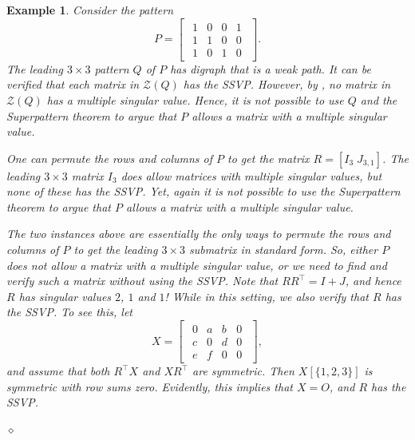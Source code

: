 \documentclass[preprint,12pt]{elsarticle}
\newcommand{\trans  }{^\top}
\newtheorem{Example}[theorem]{Example}
\begin{document}
\begin{Example}
\label{forbiddensun}
\rm
Consider the pattern 
\[
P= \begin{bmatrix}
\begin{array}{cccc}
1 & 0 &0  & 1 \\
1 & 1 & 0 & 0\\
1 & 0 & 1 & 0
\end{array}
\end{bmatrix}.
\]
The leading $3\times 3$ pattern $Q$ of $P$
has digraph that is a weak path. It can be verified that each matrix in $\mathcal{Z}(Q)$ 
has the SSVP. However,  by ,  no matrix in $\mathcal{Z}(Q)$ has a multiple singular value. Hence,
it is not possible to use $Q$ and the Superpattern theorem to argue that $P$ allows a matrix with a multiple singular value. 

One can  permute the rows and columns of $P$ to get the matrix $R=[ I_3 \; J_{3,1} ]$.
The leading $3\times 3$ matrix $I_3$ does allow matrices with multiple singular values, but none of these has the SSVP. 
Yet, again
it is not possible to use the Superpattern  theorem to argue that $P$ allows a matrix with a multiple singular value. 

The two 
instances above are essentially the only ways to permute the rows and columns of $P$ to get the leading $3\times 3$ submatrix in standard form.
So, either $P$ does not allow a matrix with 
a multiple singular value, or we need to 
find and verify such a matrix without using
the SSVP.  
Note that  $RR\trans= I+J$, and hence $R$ has 
singular values $2$, $1$ and $1$! While in this setting, we also verify that $R$ has the SSVP. 
To see this, let 
\[ 
X= \begin{bmatrix}
\begin{array}{cccc}
0 & a & b & 0 \\
c & 0 & d & 0 \\
e& f & 0 & 0 
\end{array} 
\end{bmatrix},
\]
and assume that both $R\trans X$ and $XR\trans$
are symmetric. Then
$X[\{1,2,3\}]$ is symmetric with row sums zero.
Evidently, this implies that $X=O$, and 
$R$ has the SSVP. 

\hfill $\diamond$  \end{Example}
\end{document}
